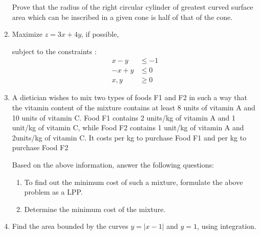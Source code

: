 \documentclass[12pt]{article}
\newcommand{\abs}[1]{\lvert#1\rvert}
\begin{document}
\begin{enumerate}
Prove that the radius of the right circular cylinder of greatest curved surface area which can be inscribed in a given cone is half of that of the cone.

\item Maximize $z=3x + 4y$, if possible,

subject to the constraints :
\begin{align}
 x - y &\le - 1 \\
-x + y &\le 0 \\
x, y &\ge 0
\end{align}


\item A dietician wishes to mix two types of foods F1 and F2 in such a way that the vitamin content of the mixture contains at least 8 units of vitamin A and 10 units of vitamin C. Food F1 contains 2 units/kg of vitamin A  and 1 unit/kg of vitamin C, while Food F2 contains 1 unit/kg of vitamin A and 2units/kg of vitamin C. It costs   per kg to purchase Food F1 and    per kg to purchase Food F2


Based on the above information, answer the following questions:


\begin{enumerate}
\item To find out the minimum cost of such a mixture, formulate the above problem as a LPP.
\item Determine the minimum cost of the mixture.
\end{enumerate}


\item Find the area bounded by the curves $y = \abs{x - 1}$ and $y = 1$, using integration.

\end{enumerate}
\end{document}
